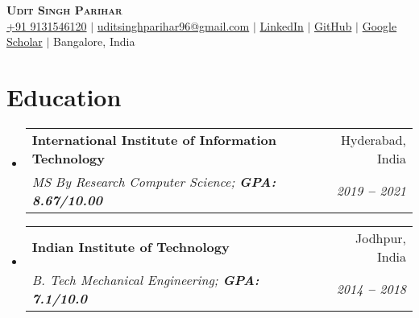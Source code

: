 \documentclass[letterpaper,11pt]{article}
\makeatletter
\newcommand{\resumeSubheading}[4]{
	\vspace{-2pt}\item
		\begin{tabular*}{0.97\textwidth}[t]{l@{\extracolsep{\fill}}r}
			\textbf{#1} & #2 \\
			\textit{\small#3} & \textit{\small #4} \\
		\end{tabular*}\vspace{-7pt}
}
\newcommand{\resumeEducationHeading}[4]{
	\vspace{-2pt}\item
		\begin{tabular*}{0.97\textwidth}[t]{l@{\extracolsep{\fill}}r}
			\textbf{#1} & #2 \\
			\textit{\small#3} & \textit{\small #4} \\
		\end{tabular*}\vspace{-5pt}
}
\newcommand{\resumeSubHeadingListStart}{\begin{itemize}[leftmargin=0.15in, label={}]}
\newcommand{\resumeSubHeadingListEnd}{\end{itemize}}
\makeatother
\begin{document}

\begin{center}
		\textbf{\Huge \scshape Udit Singh Parihar} \\ \vspace{3pt}
		\small
		\faMobile \hspace{.5pt} \href{tel:919131546120}{+91 9131546120}
		$|$
		\href{mailto:uditsinghparihar96@gmail.com}{\color{blue}\faAt \hspace{.5pt} uditsinghparihar96@gmail.com}
		$|$
		\href{https://www.linkedin.com/in/udit-singh-parihar-0bab24b7/}{\color{blue}\faLinkedinSquare \hspace{.5pt} LinkedIn}
		$|$
		\href{https://github.com/UditSinghParihar}{\color{blue}\faGithub \hspace{.5pt} GitHub}
		$|$
		\href{https://scholar.google.co.in/citations?user=fUeIp1EAAAAJ&hl=en}{\color{blue}\faGraduationCap \hspace{.5pt} Google Scholar}
		$|$
		\faMapMarker \hspace{.5pt} {Bangalore, India}
\end{center}




\section{Education}
	\vspace{3pt}
	\resumeSubHeadingListStart
		
		\resumeEducationHeading
			{International Institute of Information Technology}
			{Hyderabad, India}
			{MS By Research Computer Science;   \textbf{GPA: 8.67/10.00}}{2019 \textbf{--} 2021}
		
		\resumeSubheading
			{Indian Institute of Technology}
			{ Jodhpur, India}
			{B. Tech Mechanical Engineering;   \textbf{GPA: 7.1/10.0}}{2014 \textbf{--} 2018}
		
	\resumeSubHeadingListEnd



\end{document}
